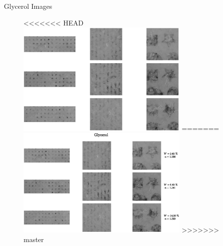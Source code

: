 \documentclass[10pt]{beamer}
\begin{document}
\begin{frame}{Glycerol Images}
\begin{figure}
    \centering
<<<<<<< HEAD
    \includegraphics[width = 0.75\textwidth]{figs/Gly_Imgs002.eps}
    \label{Glyshapes}
=======
    \includegraphics[width = 0.75\textwidth]{figs/Gly_Imgs.eps}
    \label{ex_shapes}
>>>>>>> master
\end{figure}
    
\end{frame}
\end{document}
